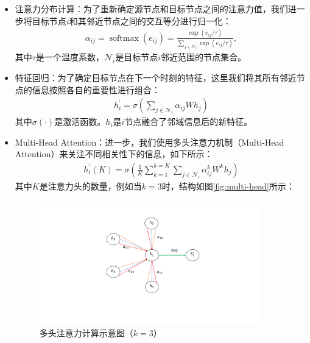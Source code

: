 \begin{itemize}
  \item 注意力分布计算：为了重新确定源节点和目标节点之间的注意力值，我们进一步将目标节点$i$和其邻近节点之间的交互等分进行归一化：
  \begin{align}
    \alpha_{i j}=\operatorname{softmax}\left(e_{i j}\right)=\frac{\exp \left(e_{i j} / \tau\right)}{\sum_{j \in \mathcal{N}_{i}} \exp \left(e_{i j} / \tau\right)},
  \end{align}
  其中$\tau$是一个温度系数，$\mathcal{N}_{i}$是目标节点$i$邻近范围的节点集合。
  \item 特征回归：为了确定目标节点在下一个时刻的特征，这里我们将其所有邻近节点的信息按照各自的重要性进行组合：
  \begin{align}
    h_{i}^{\prime}=\sigma\left(\sum_{j \in \mathcal{N}_{i}} \alpha_{i j} W h_{j}\right)
  \end{align}
  其中$\sigma(\cdot)$是激活函数。$h_{i}$是$i$节点融合了邻域信息后的新特征。
  \item Multi-Head Attention：进一步，我们使用多头注意力机制（Multi-Head Attention）来关注不同相关性下的信息，如下所示：
  \begin{align}
    h_{i}^{\prime}(K)=\sigma\left( \frac{1}{K} \sum_{k=1}^{k=K} \sum_{j \in \mathcal{N}_{i}} \alpha_{i j}^{k} W^{k} h_{j}\right)
  \end{align}
  其中$K$是注意力头的数量，例如当$k = 3$时，结构如图\autoref{fig:multi-head}所示：
  \begin{figure}[htb]
    \includegraphics[width=0.9\textwidth]{fig/multi-head.pdf}
    \caption{多头注意力计算示意图（$k=3$）}
    \label{fig:multi-head}
  \end{figure}
\end{itemize}

